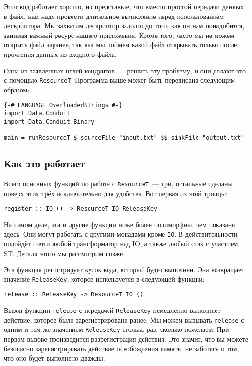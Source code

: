 Этот код работает хорошо, но представьте, что вместо простой передачи данных в файл, нам
надо провести длительное вычисление перед использованием дескриптора. Мы захватим
дескриптор задолго до того, как он нам понадобится, занимая важный ресурс нашего
приложения. Кроме того, часто мы не можем открыть файл заранее, так как мы поймем какой файл
открывать только после прочтения данных из входного файла.

Одна из заявленных целей кондуитов~--- решить эту проблему, и они делают это с помощью \lstinline'ResourceT'.
Программа выше может быть переписана следующим образом:
\begin{lstlisting}
{-# LANGUAGE OverloadedStrings #-}
import Data.Conduit
import Data.Conduit.Binary

main = runResourceT $ sourceFile "input.txt" $$ sinkFile "output.txt"
\end{lstlisting}

\subsection{Как это работает}
Всего основных функций по работе с \lstinline'ResourceT'~--- три, остальные
сделаны поверх этих трёх исключительно для удобства. Вот первая из этой троицы:
\begin{lstlisting}
register :: IO () -> ResourceT IO ReleaseKey
\end{lstlisting}

\begin{remark}
На самом деле, эта и другие функции ниже более полиморфны, чем показано здесь. Они могут работать с другими монадами кроме \lstinline'IO'. В действительности подойдёт почти любой трансформатор над
IO, а также любый стэк с участием ST. Детали этого мы рассмотрим позже.
\end{remark}

Эта функция регистрирует кусок кода, который будет выполнен. Она
возвращает значение \lstinline'ReleaseKey', которое используется в следующей функции:

\begin{lstlisting}
release :: ReleaseKey -> ResourceT IO ()
\end{lstlisting}
Вызов функции \lstinline!release! с передачей \lstinline!ReleaseKey! немедленно выполняет действие, которое было
зарегистрировано ранее. Мы можем вызывать \lstinline!release! с одним и тем же значением
\lstinline'ReleaseKey'
столько раз, сколько пожелаем. При первом вызове производится разрегистрация действия. Это
значит, что вы можете безопасно зарегистрировать действие освобождения памяти, не
заботясь о том, что оно будет выполнено дважды.

